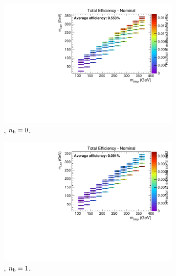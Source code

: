 \begin{figure}[h!]
  \centering
  \begin{subfigure}[b]{0.4\textwidth}
    \includegraphics[width=\textwidth, page=3]{Figs/sms/t2cc/v24/MHT_MET_T2cc_v24_eq0b_le3j_incl.pdf}
    \caption{\njlow, $n_{\text{b}} = 0$.}
  \end{subfigure}
  \begin{subfigure}[b]{0.4\textwidth}
    \includegraphics[width=\textwidth, page=3]{Figs/sms/t2cc/v24/MHT_MET_T2cc_v24_eq1b_le3j_incl.pdf}
    \caption{\njlow, $n_{\text{b}} = 1$.}
  \end{subfigure}\\
  \begin{subfigure}[b]{0.4\textwidth}

\end{subfigure}
\end{figure}
